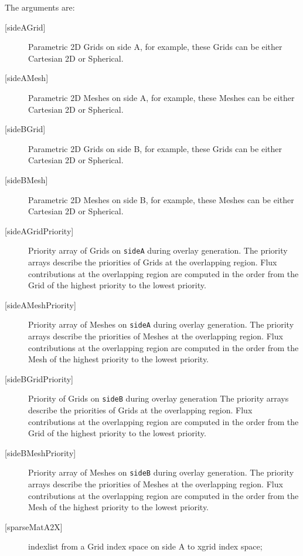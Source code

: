        The arguments are:
       \begin{description}
       \item [{[sideAGrid]}]
             Parametric 2D Grids on side A, for example, 
             these Grids can be either Cartesian 2D or Spherical.
       \item [{[sideAMesh]}]
             Parametric 2D Meshes on side A, for example, 
             these Meshes can be either Cartesian 2D or Spherical.
       \item [{[sideBGrid]}]
             Parametric 2D Grids on side B, for example, 
             these Grids can be either Cartesian 2D or Spherical.
       \item [{[sideBMesh]}]
             Parametric 2D Meshes on side B, for example, 
             these Meshes can be either Cartesian 2D or Spherical.
       \item [{[sideAGridPriority]}]
             Priority array of Grids on {\tt sideA} during overlay generation.
             The priority arrays describe the priorities of Grids at the overlapping region.
             Flux contributions at the overlapping region are computed in the order from the Grid of the
             highest priority to the lowest priority.
       \item [{[sideAMeshPriority]}]
             Priority array of Meshes on {\tt sideA} during overlay generation.
             The priority arrays describe the priorities of Meshes at the overlapping region.
             Flux contributions at the overlapping region are computed in the order from the Mesh of the
             highest priority to the lowest priority.
       \item [{[sideBGridPriority]}]
             Priority of Grids on {\tt sideB} during overlay generation
             The priority arrays describe the priorities of Grids at the overlapping region.
             Flux contributions at the overlapping region are computed in the order from the Grid of the
             highest priority to the lowest priority.
       \item [{[sideBMeshPriority]}]
             Priority array of Meshes on {\tt sideB} during overlay generation.
             The priority arrays describe the priorities of Meshes at the overlapping region.
             Flux contributions at the overlapping region are computed in the order from the Mesh of the
             highest priority to the lowest priority.
       \item [{[sparseMatA2X]}]
             indexlist from a Grid index space on side A to xgrid index space;

\end{description}
